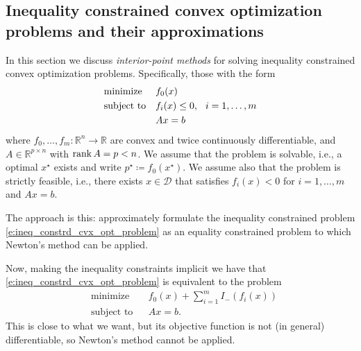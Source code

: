 \documentclass[11pt]{amsart}
\theoremstyle{definition}
\theoremstyle{remark}
\newcommand{\gap}{\hspace*{0.25cm}}
\begin{document}
    \subsection{Inequality constrained convex optimization problems and their approximations}
        In this section we discuss \emph{interior-point methods} for solving inequality constrained convex optimization problems. Specifically, those with the form
        \begin{equation}\label{e:ineq_constrd_cvx_opt_problem}
            \begin{aligned}
            & {\text{minimize}} && f_0(x) \\
            & \text{subject to} && f_i(x) \leq 0, \gap i = 1, \dots, m \\
            &                   && Ax = b
            \end{aligned}
        \end{equation}
        where $f_0, \dots, f_m: \mathbb{R}^n \to \mathbb{R}$ are convex and twice continuously differentiable, and $A \in \mathbb{R}^{p \times n}$ with $\rank A = p < n$. We assume that the problem is solvable, i.e., a optimal $x^\star$ exists and write $p^\star \coloneqq f_0(x^\star)$. We assume also that the problem is strictly feasible, i.e., there exists $x \in \mathcal{D}$ that satisfies $f_i(x)<0$ for $i = 1, \dots, m$ and $Ax = b$.

        The approach is this: approximately formulate the inequality constrained problem \eqref{e:ineq_constrd_cvx_opt_problem} as an equality constrained problem to which Newton's method can be applied.

        Now, making the inequality constraints implicit we have that \eqref{e:ineq_constrd_cvx_opt_problem} is equivalent to the problem
        \begin{equation}\label{e:impl_ineq_constrd_cvx_opt_problem}
            \begin{aligned}
            & {\text{minimize}} && f_0(x) + \sum_{i=1}^{m}{I_{-}(f_i(x))} \\
            & \text{subject to} && Ax = b.
            \end{aligned}
        \end{equation}
        This is close to what we want, but its objective function is not (in general) differentiable, so Newton's method cannot be applied.
\end{document}
